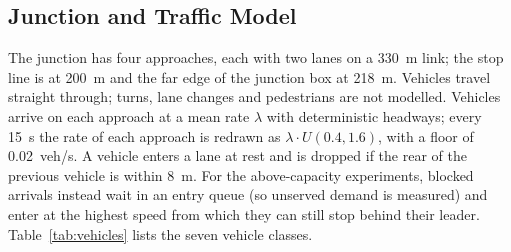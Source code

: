 \subsection{Junction and Traffic Model}
The junction has four approaches, each with two lanes on a 330~m link; the stop line is at 200~m and the far edge of the junction box at 218~m. Vehicles travel straight through; turns, lane changes and pedestrians are not modelled. Vehicles arrive on each approach at a mean rate $\lambda$ with deterministic headways; every 15~s the rate of each approach is redrawn as $\lambda\cdot U(0.4,1.6)$, with a floor of 0.02~veh/s. A vehicle enters a lane at rest and is dropped if the rear of the previous vehicle is within 8~m. For the above-capacity experiments, blocked arrivals instead wait in an entry queue (so unserved demand is measured) and enter at the highest speed from which they can still stop behind their leader. Table~\ref{tab:vehicles} lists the seven vehicle classes.

\begin{table}[H]
\centering
\caption{Vehicle classes and parameters used in the simulation}
\label{tab:vehicles}
\small
{}
\par{}
\end{table}


